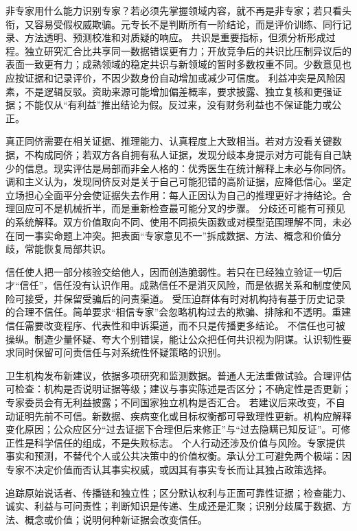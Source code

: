 非专家用什么能力识别专家？若必须先掌握领域内容，就不再是非专家；若只看头衔，又容易受假权威欺骗。元专长不是判断所有一阶结论，而是评价训练、同行记录、方法透明、预测校准和对质疑的响应\parencite{goldman2001}。 共识是重要指标，但须分析形成过程。独立研究汇合比共享同一数据错误更有力；开放竞争后的共识比压制异议后的表面一致更有力；成熟领域的稳定共识与新领域的暂时多数权重不同。少数意见也应按证据和记录评价，不因少数身份自动增加或减少可信度。 利益冲突是风险因素，不是逻辑反驳。资助来源可能增加偏差概率，要求披露、独立复核和更强证据；不能仅从“有利益”推出结论为假。反过来，没有财务利益也不保证能力或公正。

真正同侪需要在相关证据、推理能力、认真程度上大致相当。若对方没看关键数据，不构成同侪；若双方各自拥有私人证据，发现分歧本身提示对方可能有自己缺少的信息。现实评估是局部而非全人格的：优秀医生在统计解释上未必与你同侪。 调和主义认为，发现同侪反对是关于自己可能犯错的高阶证据，应降低信心\parencite{christensen2007}。坚定立场担心全面平分会使证据失去作用：每人正因认为自己的推理更好才持结论。合理回应可不是机械折半，而是重新检查最可能分叉的步骤。 分歧还可能有可预见的系统解释。双方价值取向不同、使用不同损失函数或对模型范围理解不同，未必在同一事实命题上冲突。把表面“专家意见不一”拆成数据、方法、概念和价值分歧，常能恢复局部共识。

信任使人把一部分核验交给他人，因而创造脆弱性。若只在已经独立验证一切后才“信任”，信任没有认识作用。成熟信任不是消灭风险，而是依据关系和制度使风险可接受，并保留受骗后的问责渠道。 受压迫群体有时对机构持有基于历史记录的合理不信任。简单要求“相信专家”会忽略机构过去的欺骗、排除和不透明。重建信任需要改变程序、代表性和申诉渠道，而不只是传播更多结论。 不信任也可被操纵。制造少量怀疑、夸大个别错误，能让公众把任何共识视为阴谋。认识韧性要求同时保留可问责信任与对系统性怀疑策略的识别。

卫生机构发布新建议，依据多项研究和监测数据。普通人无法重做试验。合理评估可检查：机构是否说明证据等级；建议与事实陈述是否区分；不确定性是否更新；专家委员会有无利益披露；不同国家独立机构是否汇合。 若建议后来改变，不自动证明先前不可信。新数据、疾病变化或目标权衡都可导致理性更新。机构应解释变化原因；公众应区分“过去证据下合理但后来修正”与“过去隐瞒已知反证”。可修正性是科学信任的组成，不是失败标志。 个人行动还涉及价值与风险。专家提供事实和预测，不替代个人或公共决策中的价值权衡。承认分工可避免两个极端：因专家不决定价值而否认其事实权威，或因其有事实专长而让其独占政策选择。

\begin{tcolorbox}[breakable,colback=white,colframe=blue!30!black,title={证言与专家评估表},fonttitle=\bfseries]
追踪原始说话者、传播链和独立性；区分默认权利与正面可靠性证据；检查能力、诚实、利益与可问责性；判断知识是传递、生成还是汇聚；识别分歧属于数据、方法、概念或价值；说明何种新证据会改变信任。
\end{tcolorbox}
